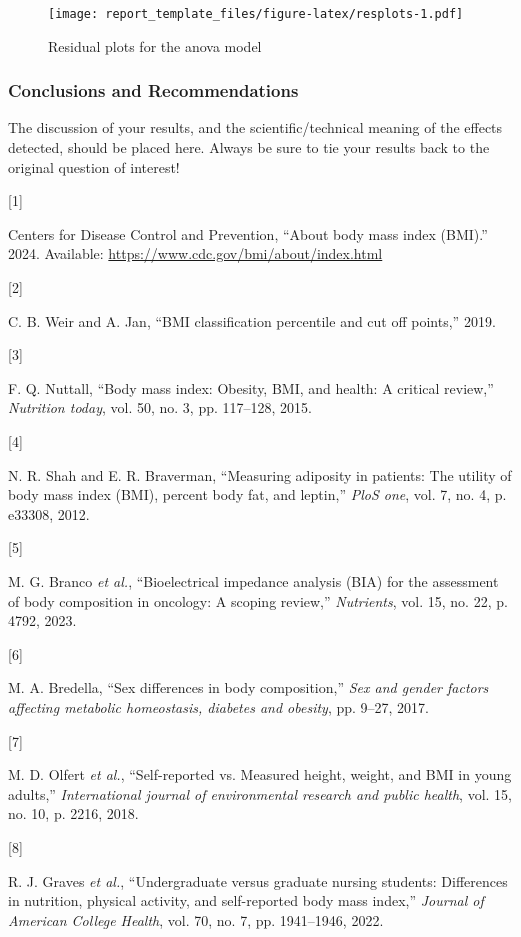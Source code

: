 \documentclass[
]{article}
\newlength{\cslhangindent}
\newlength{\csllabelwidth}
\newenvironment{CSLReferences}[2] %
 {\begin{list}{}{%
  \setlength{\itemindent}{0pt}
  \setlength{\leftmargin}{0pt}
  \setlength{\parsep}{0pt}
  \ifodd #1
   \setlength{\leftmargin}{\cslhangindent}
   \setlength{\itemindent}{-1\cslhangindent}
  \fi
  \setlength{\itemsep}{#2\baselineskip}}}
 {\end{list}}
\newcommand{\CSLLeftMargin}[1]{\parbox[t]{\csllabelwidth}{\strut#1\strut}}
\newcommand{\CSLRightInline}[1]{\parbox[t]{\linewidth - \csllabelwidth}{\strut#1\strut}}
\begin{document}
\begin{figure}
\centering
\texttt{[image: report\_template\_files/figure-latex/resplots-1.pdf]}
\caption{Residual plots for the anova model}
\end{figure}

\subsubsection{Conclusions and
Recommendations}\label{conclusions-and-recommendations}

The discussion of your results, and the scientific/technical meaning of
the effects detected, should be placed here. Always be sure to tie your
results back to the original question of interest!

\label{refs}
\begin{CSLReferences}{0}{0}
\CSLLeftMargin{{[}1{]} }%
\CSLRightInline{Centers for Disease Control and Prevention, {``About
body mass index (BMI).''} 2024. Available:
\url{https://www.cdc.gov/bmi/about/index.html}}

\CSLLeftMargin{{[}2{]} }%
\CSLRightInline{C. B. Weir and A. Jan, {``BMI classification percentile
and cut off points,''} 2019.}

\CSLLeftMargin{{[}3{]} }%
\CSLRightInline{F. Q. Nuttall, {``Body mass index: Obesity, BMI, and
health: A critical review,''} \emph{Nutrition today}, vol. 50, no. 3,
pp. 117--128, 2015.}

\CSLLeftMargin{{[}4{]} }%
\CSLRightInline{N. R. Shah and E. R. Braverman, {``Measuring adiposity
in patients: The utility of body mass index (BMI), percent body fat, and
leptin,''} \emph{PloS one}, vol. 7, no. 4, p. e33308, 2012.}

\CSLLeftMargin{{[}5{]} }%
\CSLRightInline{M. G. Branco \emph{et al.}, {``Bioelectrical impedance
analysis (BIA) for the assessment of body composition in oncology: A
scoping review,''} \emph{Nutrients}, vol. 15, no. 22, p. 4792, 2023.}

\CSLLeftMargin{{[}6{]} }%
\CSLRightInline{M. A. Bredella, {``Sex differences in body
composition,''} \emph{Sex and gender factors affecting metabolic
homeostasis, diabetes and obesity}, pp. 9--27, 2017.}

\CSLLeftMargin{{[}7{]} }%
\CSLRightInline{M. D. Olfert \emph{et al.}, {``Self-reported vs.
Measured height, weight, and BMI in young adults,''} \emph{International
journal of environmental research and public health}, vol. 15, no. 10,
p. 2216, 2018.}

\CSLLeftMargin{{[}8{]} }%
\CSLRightInline{R. J. Graves \emph{et al.}, {``Undergraduate versus
graduate nursing students: Differences in nutrition, physical activity,
and self-reported body mass index,''} \emph{Journal of American College
Health}, vol. 70, no. 7, pp. 1941--1946, 2022.}

\end{CSLReferences}
\end{document}
